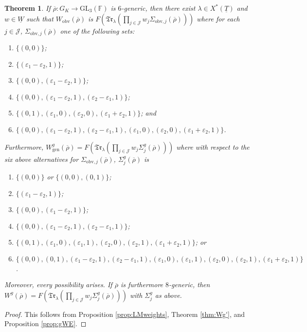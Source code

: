 \documentclass[oneside,a4paper,english, 11pt]{amsart}
\theoremstyle{plain}
\newtheorem{thm}{Theorem}[subsection]
\theoremstyle{plain}
\theoremstyle{plain}
\theoremstyle{plain}
\theoremstyle{plain}
\theoremstyle{plain}
\theoremstyle{definition}
\theoremstyle{definition}
\theoremstyle{definition}
\theoremstyle{remark}
\numberwithin{equation}{section}
\newcommand{\F}{\mathbb{F}}
\newcommand{\cJ}{\mathcal{J}}
\newcommand{\eps}{\varepsilon}
\newcommand{\GL}{\mathrm{GL}}
\newcommand{\un}[1]{\underline{#1}}
\newcommand{\rhobar}{\overline{\rho}}
\newcommand{\Trns}{\mathfrak{Tr}}
\newcommand{\obv}{\mathrm{obv}}
\newcommand{\ra}{\rightarrow}
\begin{document}
\begin{thm}\label{thm:Wg}
%
If $\rhobar: G_K \ra \GL_3(\F)$ is $6$-generic, then there exist $\lambda \in X^*(\un{T})$ and $w\in \un{W}$ such that $W_{\obv}(\rhobar)$ is $F(\Trns_\lambda(\prod_{j\in \cJ} w_j\Sigma_{\mathrm{obv},j}(\rhobar)))$ where for each $j\in \cJ$, $\Sigma_{\mathrm{obv},j}(\rhobar)$ one of the following sets: 
\begin{enumerate}
\item
\label{case1} 
$\{(0,0)\}$;
\item
\label{case2} 
$\{(\eps_1-\eps_2,1)\}$;
\item
\label{case3} 
$\{(0,0),(\eps_1-\eps_2,1)\}$;
\item 
\label{case4}
$\{(0,0),(\eps_1-\eps_2,1), (\eps_2-\eps_1,1)\}$;
\item 
\label{case5}
$\{(0,1),(\eps_1,0), (\eps_2,0), (\eps_1+\eps_2,1)\}$; and
\item 
\label{case6}
$\{(0,0),(\eps_1-\eps_2,1), (\eps_2-\eps_1,1), (\eps_1,0),(\eps_2,0),(\eps_1+\eps_2,1)\}$.
\end{enumerate}
Furthermore, $W^g_{\mathrm{gen}}(\rhobar) = F(\Trns_\lambda(\prod_{j\in \cJ} w_j\Sigma^{g}_j(\rhobar)))$ where with respect to the six above alternatives for $\Sigma_{\mathrm{obv},j}(\rhobar)$, $\Sigma^{g}_j(\rhobar)$ is 
\begin{enumerate}[label=(\arabic*$'$)]
\item
\label{case1:thm:Wg}
$\{(0,0)\}$ or $\{(0,0),(0,1)\}$;
\item 
\label{case2:thm:Wg}
$\{(\eps_1-\eps_2,1)\}$;
\item 
\label{case3:thm:Wg}
$\{(0,0),(\eps_1-\eps_2,1)\}$;
\item 
\label{case4:thm:Wg}
$\{(0,0),(\eps_1-\eps_2,1), (\eps_2-\eps_1,1)\}$;
\item 
\label{case5:thm:Wg}
$\{(0,1),(\eps_1,0),(\eps_1,1), (\eps_2,0),(\eps_2,1), (\eps_1+\eps_2,1)\}$; or
\item 
\label{case6:thm:Wg}
$\{(0,0),(0,1),(\eps_1-\eps_2,1), (\eps_2-\eps_1,1), (\eps_1,0),(\eps_1,1),(\eps_2,0),(\eps_2,1),(\eps_1+\eps_2,1)\}$. 
\end{enumerate}
Moreover, every possibility arises. 
If $\rhobar$ is furthermore $8$-generic, then $W^g(\rhobar)= F(\Trns_\lambda(\prod_{j\in \cJ} w_j\Sigma^{g}_j(\rhobar)))$ with $\Sigma^{g}_j$ as above.
\end{thm}
\begin{proof}
This follows from Proposition \ref{prop:LMweights}, Theorem \ref{thm:Wg'}, and Proposition \ref{prop:gWE}.
\end{proof}
\end{document}
